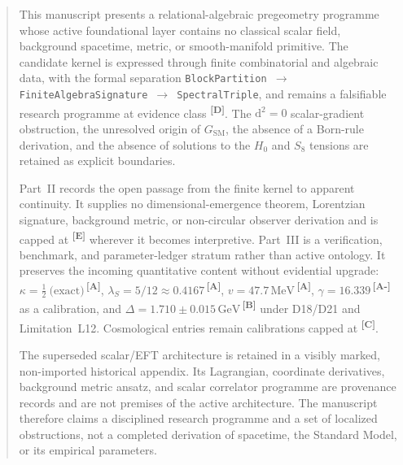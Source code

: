 \documentclass[12pt,a4paper,twoside]{article}
\theoremstyle{plain}
\theoremstyle{definition}
\theoremstyle{remark}
\newcommand{\GeV}{\,\mathrm{GeV}}
\newcommand{\MeV}{\,\mathrm{MeV}}
\newcommand{\catmark}[1]{\textsuperscript{\textsf{\textbf{[#1]}}}}
\newcommand{\lambdaS}{5/12 \approx 0.4167} %
\newcommand{\DeltaGap}{1.710 \pm 0.015\GeV} %
\newcommand{\GammaGeom}{16.339} %
\newcommand{\vVEV}{47.7\MeV} %
\newcommand{\KappaRG}{\tfrac{1}{2}\ \text{(exact)}} %
\begin{document}
\begin{abstract}
\begingroup \normalfont\normalsize
\setlength{\parskip}{0.65em plus 0.12em minus 0.04em}%
\setlength{\parindent}{0pt}%
\noindent This manuscript presents a relational-algebraic pregeometry
programme whose active foundational layer contains no classical scalar field,
background spacetime, metric, or smooth-manifold primitive. The candidate
kernel is expressed through finite combinatorial and algebraic data, with the
formal separation
\texttt{BlockPartition $\to$ FiniteAlgebraSignature $\to$ SpectralTriple},
and remains a falsifiable research programme at evidence class \catmark{D}.
The $\mathrm d^2=0$ scalar-gradient obstruction, the unresolved origin of
$G_{\mathrm{SM}}$, the absence of a Born-rule derivation, and the absence of
solutions to the $H_0$ and $S_8$ tensions are retained as explicit
boundaries.

Part~II records the open passage from the finite kernel to apparent
continuity. It supplies no dimensional-emergence theorem, Lorentzian
signature, background metric, or non-circular observer derivation and is
capped at \catmark{E} wherever it becomes interpretive. Part~III is a
verification, benchmark, and parameter-ledger stratum rather than active
ontology. It preserves the incoming quantitative content without evidential
upgrade: $\kappa=\KappaRG$\,\catmark{A},
$\lambda_S=\lambdaS$\,\catmark{A}, $v=\vVEV$\,\catmark{A},
$\gamma=\GammaGeom$\,\catmark{A-} as a calibration, and
$\Delta=\DeltaGap$\,\catmark{B} under D18/D21 and Limitation~L12.
Cosmological entries remain calibrations capped at \catmark{C}.

The superseded scalar/EFT architecture is retained in a visibly marked,
non-imported historical appendix. Its Lagrangian, coordinate derivatives,
background metric ansatz, and scalar correlator programme are provenance
records and are not premises of the active architecture. The manuscript
therefore claims a disciplined research programme and a set of localized
obstructions, not a completed derivation of spacetime, the Standard Model, or
its empirical parameters.
\endgroup
\end{abstract}

\newpage

\end{document}
